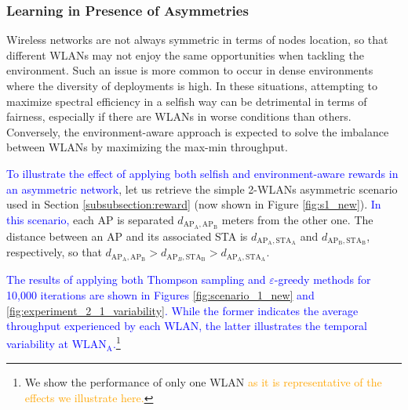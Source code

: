 \documentclass[preprint,12pt]{elsarticle}
\begin{document}
\subsubsection{Learning in Presence of Asymmetries}
\label{subsubsection:fairness}  	
Wireless networks are not always symmetric in terms of nodes location, so that different WLANs may not enjoy the same opportunities when tackling the environment. Such an issue is more common to occur in dense environments where the diversity of deployments is high. In these situations, attempting to maximize spectral efficiency in a selfish way can be detrimental in terms of fairness, especially if there are WLANs in worse conditions than others. Conversely, the environment-aware approach is expected to solve the imbalance between WLANs by maximizing the max-min throughput.

\textcolor{blue}{To illustrate the effect of applying both selfish and environment-aware rewards in an asymmetric network}, let us retrieve the simple 2-WLANs asymmetric scenario used in Section \ref{subsubsection:reward} (now shown in Figure \ref{fig:s1_new}). \textcolor{blue}{In this scenario,} each AP is separated $d_{\text{AP}_\text{A},\text{AP}_\text{B}}$ meters from the other one. The distance between an AP and its associated STA is $d_{\text{AP}_\text{A},\text{STA}_\text{A}}$ and $d_{\text{AP}_\text{B},\text{STA}_\text{B}}$, respectively, so that $d_{\text{AP}_\text{A},\text{AP}_\text{B}} > d_{\text{AP}_B,\text{STA}_\text{B}} > d_{\text{AP}_\text{A},\text{STA}_\text{A}}$. 

\textcolor{blue}{The results of applying both Thompson sampling and $\varepsilon$-greedy methods for 10,000 iterations are shown in Figures \ref{fig:scenario_1_new} and \ref{fig:experiment_2_1_variability}. While the former indicates the average throughput experienced by each WLAN, the latter illustrates the temporal variability at $\text{WLAN}_\text{A}$.\footnote{We show the performance of only one WLAN \textcolor{orange}{as it is representative of the effects we illustrate here.}}}
\end{document}
